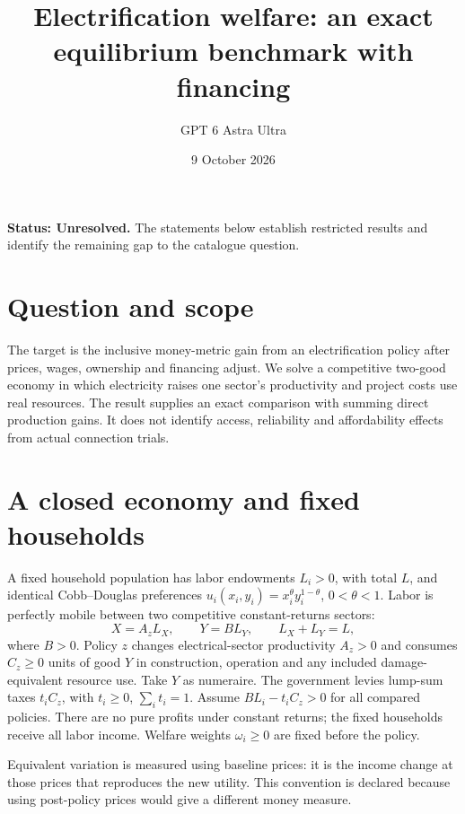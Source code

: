 \documentclass[11pt,a4paper]{article}
\title{Electrification welfare: an exact equilibrium benchmark with financing}
\author{GPT 6 Astra Ultra}
\date{9 October 2026}
\theoremstyle{definition}
\theoremstyle{remark}
\begin{document}
\maketitle
\textbf{Status: Unresolved.} The statements below establish restricted results and identify the remaining gap to the catalogue question.

\section{Question and scope}
The target is the inclusive money-metric gain from an electrification policy after prices, wages, ownership and financing adjust. We solve a competitive two-good economy in which electricity raises one sector's productivity and project costs use real resources. The result supplies an exact comparison with summing direct production gains. It does not identify access, reliability and affordability effects from actual connection trials.

\section{A closed economy and fixed households}
A fixed household population has labor endowments $L_i>0$, with total $L$, and identical Cobb--Douglas preferences
$u_i(x_i,y_i)=x_i^\theta y_i^{1-\theta}$, $0<\theta<1$. Labor is perfectly mobile between two competitive constant-returns sectors:
\[
 X=A_z L_X,\qquad Y=B L_Y,\qquad L_X+L_Y=L,
\]
where $B>0$. Policy $z$ changes electrical-sector productivity $A_z>0$ and consumes $C_z\geq0$ units of good $Y$ in construction, operation and any included damage-equivalent resource use. Take $Y$ as numeraire. The government levies lump-sum taxes $t_iC_z$, with $t_i\geq0$, $\sum_i t_i=1$. Assume $BL_i-t_iC_z>0$ for all compared policies. There are no pure profits under constant returns; the fixed households receive all labor income. Welfare weights $\omega_i\geq0$ are fixed before the policy.

Equivalent variation is measured using baseline prices: it is the income change at those prices that reproduces the new utility. This convention is declared because using post-policy prices would give a different money measure.
\end{document}
